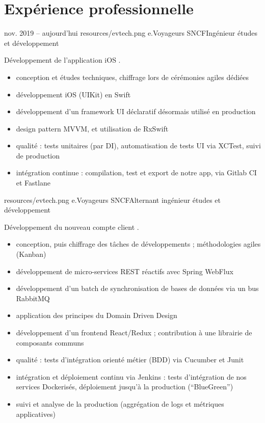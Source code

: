 \documentclass{cv}
\begin{document}
\section{Expérience professionnelle}

\experience
{{nov. 2019 -- aujourd'hui}}
{resources/evtech.png}
{e.Voyageurs SNCF}{Ingénieur études et développement}{

Développement de l'application iOS \href{https://apps.apple.com/fr/app/oui-sncf-train-et-bus/id343889987}{\link{\ouisncf{}}}.

\begin{itemize}
	\item conception et études techniques, chiffrage lors de cérémonies agiles dédiées
	\item développement iOS (UIKit) en Swift
	\item développement d'un framework UI déclaratif désormais utilisé en production
	\item design pattern MVVM, et utilisation de RxSwift
	\item qualité : tests unitaires (par DI), automatisation de tests UI via XCTest, suivi de production
	\item intégration continue : compilation, test et export de notre app, via Gitlab CI et Fastlane
\end{itemize}
}

{resources/evtech.png}
{e.Voyageurs SNCF}{Alternant ingénieur études et développement}{

Développement du nouveau compte client \ouisncf{}. 

\begin{itemize}
	\item conception, puis chiffrage des tâches de développements ; méthodologies agiles (Kanban)
	\item développement de micro-services REST réactifs avec Spring WebFlux
	\item développement d'un batch de synchronisation de bases de données via un bus RabbitMQ
	\item application des principes du Domain Driven Design
	\item développement d'un frontend React/Redux ; contribution à une librairie de composants communs
	\item qualité : tests d'intégration orienté métier (BDD) via Cucumber et Junit
	\item intégration et déploiement continu via Jenkins : tests d'intégration de nos services Dockerisés, 
	déploiement jusqu'à la production (``BlueGreen'')
	\item suivi et analyse de la production (aggrégation de logs et métriques applicatives)
\end{itemize}
}
\end{document}
